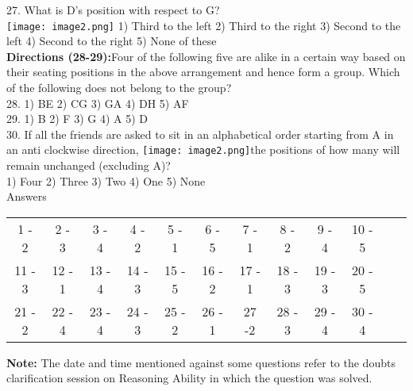 \documentclass[
]{article}
\begin{document}
27. What is D’s position with respect to G?\\
\texttt{[image: image2.png]}
1) Third to the left \hspace{2mm}2) Third to the right \hspace{2mm}3) Second to the left
\hspace{2mm}4) Second to the right \hspace{2mm}5) None of these\\

\textbf{Directions (28-29):}Four of the following five are alike in a certain way based on their seating
positions in the above arrangement and hence form a group. Which of the following does not
belong to the group?\\

28. 1) BE \hspace{2mm}2) CG \hspace{2mm}3) GA \hspace{2mm}4) DH \hspace{2mm}5) AF\\

29. 1) B \hspace{2mm}2) F \hspace{2mm}3) G \hspace{2mm}4) A \hspace{2mm}5) D\\

30. If all the friends are asked to sit in an alphabetical order starting from A in an anti clockwise
direction, \texttt{[image: image2.png]}the positions of how many will remain unchanged (excluding A)?\\
1) Four \hspace{2mm}2) Three \hspace{2mm}3) Two \hspace{2mm}4) One \hspace{2mm}5) None\\

Answers
\begin{tabular}{c c c c c c c c c c c c }
1 - 2 &2 - 3 &3 - 4& 4 - 2& 5 - 1& 6 - 5& 7 - 1& 8 - 2& 9 - 4& 10 - 5\\
11 - 3 &12 - 1& 13 - 4 &14 - 3 &15 - 5& 16 - 2 &17 - 1 &18 - 3& 19 - 3 &20 - 5\\
21 - 2 &22 - 4 &23 - 4 &24 - 3 &25 - 2 &26 - 1 &27 -2 &28 - 3 &29 - 4 &30 - 4\\
\end{tabular}


\textbf{Note:} The date and time mentioned against some questions refer to the doubts clarification
session on Reasoning Ability in which the question was solved.
\end{document}
